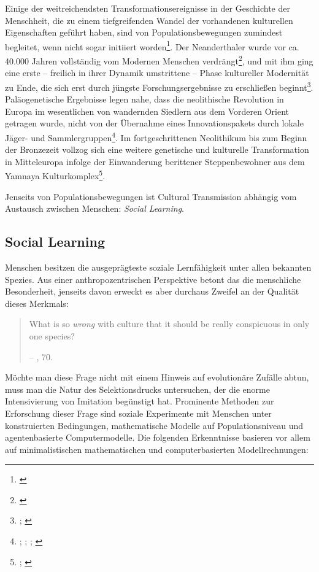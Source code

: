 \documentclass[openany,twoside,twocolumn]{book}
\let\rmarkdownfootnote\footnote%
\def\footnote{\protect\rmarkdownfootnote}
\begin{document}
Einige der weitreichendsten Transformationsereignisse in der Geschichte
der Menschheit, die zu einem tiefgreifenden Wandel der vorhandenen
kulturellen Eigenschaften geführt haben, sind von Populationsbewegungen
zumindest begleitet, wenn nicht sogar initiiert worden\footnote{\textcite{boyd_voting_2009}}.
Der Neanderthaler wurde vor ca. 40.000 Jahren vollständig vom Modernen
Menschen verdrängt\footnote{\textcite{skoglund_origins_2012}}, und mit
ihm ging eine erste -- freilich in ihrer Dynamik umstrittene -- Phase
kultureller Modernität zu Ende, die sich erst durch jüngste
Forschungsergebnisse zu erschließen beginnt\footnote{\textcite{hoffmann_symbolic_2018};
  \textcite{tuniz_did_2012}}. Paläogenetische Ergebnisse legen nahe,
dass die neolithische Revolution in Europa im wesentlichen von
wandernden Siedlern aus dem Vorderen Orient getragen wurde, nicht von
der Übernahme eines Innovationspakets durch lokale Jäger- und
Sammlergruppen\footnote{\textcite{aoki_travelling_1996};
  \textcite{bar-yosef_nature_1998}; \textcite{patterson_modelling_2010};
  \textcite{skoglund_origins_2012}}. Im fortgeschrittenen Neolithikum
bis zum Beginn der Bronzezeit vollzog sich eine weitere genetische und
kulturelle Transformation in Mitteleuropa infolge der Einwanderung
berittener Steppenbewohner aus dem Yamnaya Kulturkomplex\footnote{\textcite{allentoft_population_2015};
  \textcite{goldberg_ancient_2017}}.

Jenseits von Populationsbewegungen ist Cultural Transmission abhängig
vom Austausch zwischen Menschen: \emph{Social Learning}.

\hypertarget{social-learning}{%
\subsection{Social Learning}\label{social-learning}}

Menschen besitzen die ausgeprägteste soziale Lernfähigkeit unter allen
bekannten Spezies. Aus einer anthropozentrischen Perspektive betont das
die menschliche Besonderheit, jenseits davon erweckt es aber durchaus
Zweifel an der Qualität dieses Merkmals:

\begin{quote}
What is so \emph{wrong} with culture that it should be really
conspicuous in only one species?

-- \textcite{smith_cultural_1992}, 70.
\end{quote}

Möchte man diese Frage nicht mit einem Hinweis auf evolutionäre Zufälle
abtun, muss man die Natur des Selektionsdrucks untersuchen, der die
enorme Intensivierung von Imitation begünstigt hat. Prominente Methoden
zur Erforschung dieser Frage sind soziale Experimente mit Menschen unter
konstruierten Bedingungen, mathematische Modelle auf Populationsniveau
und agentenbasierte Computermodelle. Die folgenden Erkenntnisse basieren
vor allem auf minimalistischen mathematischen und computerbasierten
Modellrechnungen:
\end{document}
